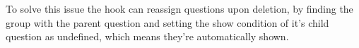 To solve this issue the hook can reassign questions upon deletion, by finding the group with the parent question and setting the show condition of it's child question as undefined, which means they're automatically shown.


%
%
%










